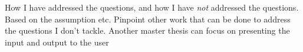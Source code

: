 \documentclass[a4paper,english]{ifimaster}
\begin{document}



How I have addressed the questions, and how I have \emph{not} addressed the questions. Based on the assumption etc. Pinpoint other work that can be done to address the questions I don't tackle.
Another master thesis can focus on presenting the input and output to the user

\backmatter{}

\printbibliography
\end{document}
